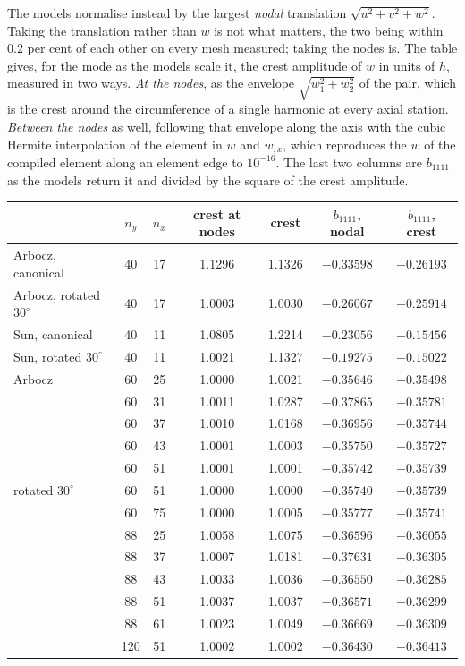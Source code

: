 \documentclass[11pt,a4paper]{article}
\begin{document}
The models normalise instead by the largest \emph{nodal} translation
$\sqrt{u^2 + v^2 + w^2}$.  Taking the translation rather than $w$ is not what
matters, the two being within $0.2$ per cent of each other on every mesh
measured; taking the nodes is.  The table gives, for the mode as the models
scale it, the crest amplitude of $w$ in units of $h$, measured in two ways.
\emph{At the nodes}, as the envelope $\sqrt{w_1^2 + w_2^2}$ of the pair, which
is the crest around the circumference of a single harmonic at every axial
station.  \emph{Between the nodes} as well, following that envelope along the
axis with the cubic Hermite interpolation of the element in $w$ and $w_{,x}$,
which reproduces the $w$ of the compiled element along an element edge to
$10^{-16}$.  The last two columns are $b_{1111}$ as the models return it and
divided by the square of the crest amplitude.

\begin{center}
\begin{tabular}{lcccccc}
\toprule
 & $n_y$ & $n_x$ & crest at nodes & crest & $b_{1111}$, nodal & $b_{1111}$, crest \\
\midrule
Arbocz, canonical      & 40  & 17 & 1.1296 & 1.1326 & $-0.33598$ & $-0.26193$ \\
Arbocz, rotated $30^\circ$ & 40 & 17 & 1.0003 & 1.0030 & $-0.26067$ & $-0.25914$ \\
Sun, canonical         & 40  & 11 & 1.0805 & 1.2214 & $-0.23056$ & $-0.15456$ \\
Sun, rotated $30^\circ$ & 40 & 11 & 1.0021 & 1.1327 & $-0.19275$ & $-0.15022$ \\
\midrule
Arbocz & 60 & 25 & 1.0000 & 1.0021 & $-0.35646$ & $-0.35498$ \\
       & 60 & 31 & 1.0011 & 1.0287 & $-0.37865$ & $-0.35781$ \\
       & 60 & 37 & 1.0010 & 1.0168 & $-0.36956$ & $-0.35744$ \\
       & 60 & 43 & 1.0001 & 1.0003 & $-0.35750$ & $-0.35727$ \\
       & 60 & 51 & 1.0001 & 1.0001 & $-0.35742$ & $-0.35739$ \\
rotated $30^\circ$ & 60 & 51 & 1.0000 & 1.0000 & $-0.35740$ & $-0.35739$ \\
       & 60 & 75 & 1.0000 & 1.0005 & $-0.35777$ & $-0.35741$ \\
       & 88 & 25 & 1.0058 & 1.0075 & $-0.36596$ & $-0.36055$ \\
       & 88 & 37 & 1.0007 & 1.0181 & $-0.37631$ & $-0.36305$ \\
       & 88 & 43 & 1.0033 & 1.0036 & $-0.36550$ & $-0.36285$ \\
       & 88 & 51 & 1.0037 & 1.0037 & $-0.36571$ & $-0.36299$ \\
       & 88 & 61 & 1.0023 & 1.0049 & $-0.36669$ & $-0.36309$ \\
       & 120 & 51 & 1.0002 & 1.0002 & $-0.36430$ & $-0.36413$ \\
\bottomrule
\end{tabular}
\end{center}
\end{document}
